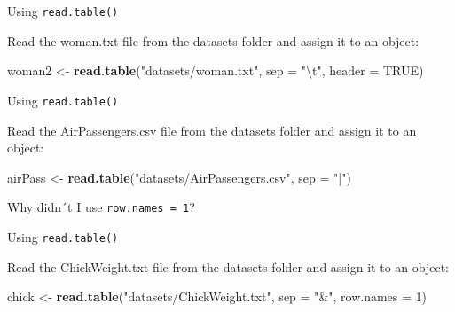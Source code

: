 \documentclass[ignorenonframetext,]{beamer}
\newenvironment{Shaded}{\begin{snugshade}}{\end{snugshade}}
\newcommand{\CharTok}[1]{\textcolor[rgb]{0.31,0.60,0.02}{#1}}
\newcommand{\DataTypeTok}[1]{\textcolor[rgb]{0.13,0.29,0.53}{#1}}
\newcommand{\DecValTok}[1]{\textcolor[rgb]{0.00,0.00,0.81}{#1}}
\newcommand{\KeywordTok}[1]{\textcolor[rgb]{0.13,0.29,0.53}{\textbf{#1}}}
\newcommand{\NormalTok}[1]{#1}
\newcommand{\OtherTok}[1]{\textcolor[rgb]{0.56,0.35,0.01}{#1}}
\newcommand{\StringTok}[1]{\textcolor[rgb]{0.31,0.60,0.02}{#1}}
\begin{document}
\begin{frame}[fragile]{Using \texttt{read.table()}}
\protect\hypertarget{using-read.table}{}

Read the woman.txt file from the datasets folder and assign it to an
object:

\begin{Shaded}
\begin{Highlighting}[]
\NormalTok{woman2 <-}\StringTok{ }\KeywordTok{read.table}\NormalTok{(}\StringTok{"datasets/woman.txt"}\NormalTok{,}
                     \DataTypeTok{sep =} \StringTok{"}\CharTok{\textbackslash{}t}\StringTok{"}\NormalTok{,}
                     \DataTypeTok{header =} \OtherTok{TRUE}\NormalTok{)}
\end{Highlighting}
\end{Shaded}

\end{frame}

\begin{frame}[fragile]{Using \texttt{read.table()}}
\protect\hypertarget{using-read.table-1}{}

Read the AirPassengers.csv file from the datasets folder and assign it
to an object:

\begin{Shaded}
\begin{Highlighting}[]
\NormalTok{airPass <-}\StringTok{ }\KeywordTok{read.table}\NormalTok{(}\StringTok{"datasets/AirPassengers.csv"}\NormalTok{,}
                      \DataTypeTok{sep =} \StringTok{"|"}\NormalTok{)}
\end{Highlighting}
\end{Shaded}

Why didn´t I use \texttt{row.names\ =\ 1}?

\end{frame}

\begin{frame}[fragile]{Using \texttt{read.table()}}
\protect\hypertarget{using-read.table-2}{}

Read the ChickWeight.txt file from the datasets folder and assign it to
an object:

\begin{Shaded}
\begin{Highlighting}[]
\NormalTok{chick <-}\StringTok{ }\KeywordTok{read.table}\NormalTok{(}\StringTok{"datasets/ChickWeight.txt"}\NormalTok{,}
                    \DataTypeTok{sep =} \StringTok{"&"}\NormalTok{,}
                    \DataTypeTok{row.names =} \DecValTok{1}\NormalTok{)}
\end{Highlighting}
\end{Shaded}

\end{frame}
\end{document}
